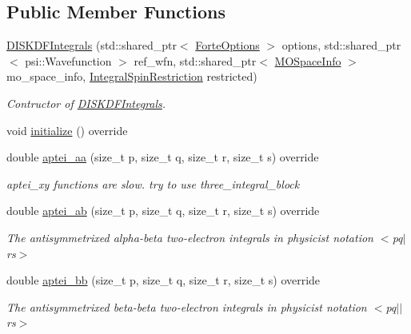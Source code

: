 \subsection*{Public Member Functions}
\begin{DoxyCompactItemize}
\item 
\mbox{\hyperlink{classforte_1_1_d_i_s_k_d_f_integrals_a2415c0e724a0baf1bd0e1f10190fbeed}{D\+I\+S\+K\+D\+F\+Integrals}} (std\+::shared\+\_\+ptr$<$ \mbox{\hyperlink{classforte_1_1_forte_options}{Forte\+Options}} $>$ options, std\+::shared\+\_\+ptr$<$ psi\+::\+Wavefunction $>$ ref\+\_\+wfn, std\+::shared\+\_\+ptr$<$ \mbox{\hyperlink{classforte_1_1_m_o_space_info}{M\+O\+Space\+Info}} $>$ mo\+\_\+space\+\_\+info, \mbox{\hyperlink{namespaceforte_a7defa2660dd3eb07aa81176b90781be7}{Integral\+Spin\+Restriction}} restricted)
\begin{DoxyCompactList}\small\item\em Contructor of \mbox{\hyperlink{classforte_1_1_d_i_s_k_d_f_integrals}{D\+I\+S\+K\+D\+F\+Integrals}}. \end{DoxyCompactList}\item 
void \mbox{\hyperlink{classforte_1_1_d_i_s_k_d_f_integrals_a3205b9dc431a7104969132b1f4bc206f}{initialize}} () override
\item 
double \mbox{\hyperlink{classforte_1_1_d_i_s_k_d_f_integrals_a3a815a39bc2f01a1cb5398e857f56285}{aptei\+\_\+aa}} (size\+\_\+t p, size\+\_\+t q, size\+\_\+t r, size\+\_\+t s) override
\begin{DoxyCompactList}\small\item\em aptei\+\_\+xy functions are slow. try to use three\+\_\+integral\+\_\+block \end{DoxyCompactList}\item 
double \mbox{\hyperlink{classforte_1_1_d_i_s_k_d_f_integrals_aa0ab48ce47dab83c35bf3b9433273f59}{aptei\+\_\+ab}} (size\+\_\+t p, size\+\_\+t q, size\+\_\+t r, size\+\_\+t s) override
\begin{DoxyCompactList}\small\item\em The antisymmetrixed alpha-\/beta two-\/electron integrals in physicist notation $<$pq$\vert$rs$>$ \end{DoxyCompactList}\item 
double \mbox{\hyperlink{classforte_1_1_d_i_s_k_d_f_integrals_a84224ddc5210cad49b63e74bdd1d4342}{aptei\+\_\+bb}} (size\+\_\+t p, size\+\_\+t q, size\+\_\+t r, size\+\_\+t s) override
\begin{DoxyCompactList}\small\item\em The antisymmetrixed beta-\/beta two-\/electron integrals in physicist notation $<$pq$\vert$$\vert$rs$>$ \end{DoxyCompactList}\item 

\end{DoxyCompactItemize}

